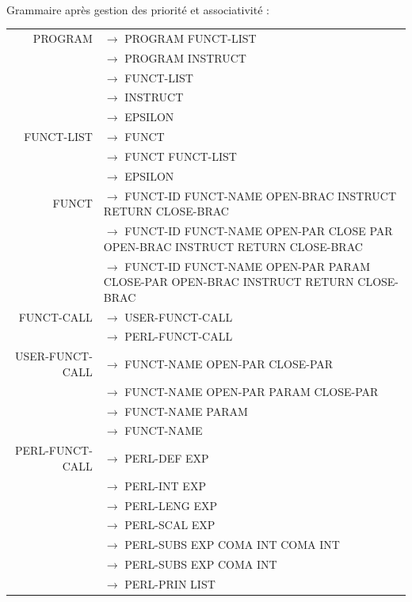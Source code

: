 \documentclass[a4paper,10pt]{article}
\begin{document}
~\\

Grammaire après gestion des priorité et associativité :

\hspace{-4.5cm}\begin{tabular}{rl}
PROGRAM				& $\rightarrow$ PROGRAM FUNCT-LIST\\
					& $\rightarrow$ PROGRAM INSTRUCT\\
					& $\rightarrow$ FUNCT-LIST\\
					& $\rightarrow$ INSTRUCT\\
					& $\rightarrow$ EPSILON\\
					
					
FUNCT-LIST			& $\rightarrow$ FUNCT \\
					& $\rightarrow$ FUNCT FUNCT-LIST\\
					& $\rightarrow$ EPSILON\\
					
FUNCT				& $\rightarrow$ FUNCT-ID FUNCT-NAME OPEN-BRAC INSTRUCT RETURN CLOSE-BRAC \\
					& $\rightarrow$ FUNCT-ID FUNCT-NAME OPEN-PAR CLOSE PAR OPEN-BRAC INSTRUCT RETURN CLOSE-BRAC \\
					& $\rightarrow$ FUNCT-ID FUNCT-NAME OPEN-PAR PARAM CLOSE-PAR OPEN-BRAC INSTRUCT RETURN CLOSE-BRAC \\

FUNCT-CALL			& $\rightarrow$ USER-FUNCT-CALL \\
					& $\rightarrow$ PERL-FUNCT-CALL \\

USER-FUNCT-CALL		& $\rightarrow$ FUNCT-NAME OPEN-PAR CLOSE-PAR\\ 
					& $\rightarrow$ FUNCT-NAME OPEN-PAR PARAM CLOSE-PAR\\ 
					& $\rightarrow$ FUNCT-NAME PARAM\\ 
					& $\rightarrow$ FUNCT-NAME\\ 

				
PERL-FUNCT-CALL		& $\rightarrow$ PERL-DEF EXP \\
					& $\rightarrow$ PERL-INT EXP \\
					& $\rightarrow$ PERL-LENG EXP \\ 
					& $\rightarrow$ PERL-SCAL EXP \\
					& $\rightarrow$ PERL-SUBS EXP COMA INT COMA INT \\
					& $\rightarrow$ PERL-SUBS EXP COMA INT  \\
					& $\rightarrow$ PERL-PRIN LIST \\ 
					

\end{tabular}
\end{document}
